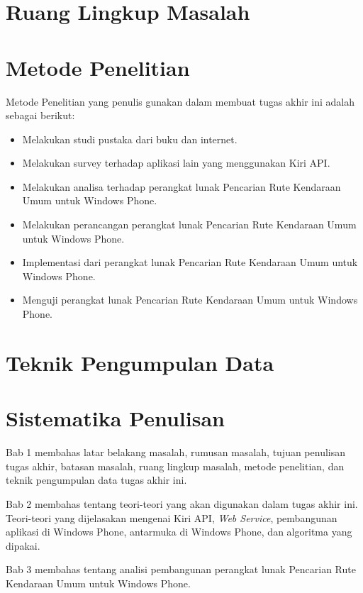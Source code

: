\section{Ruang Lingkup Masalah}
\label{sec:ruang_lingkup_masalah}

\section{Metode Penelitian}
\label{sec:metode_penelitian}
Metode Penelitian yang penulis gunakan dalam membuat tugas akhir ini adalah sebagai berikut:
\begin{itemize}
	\item Melakukan studi pustaka dari buku dan internet.
	\item Melakukan survey terhadap aplikasi lain yang menggunakan Kiri API.
	\item Melakukan analisa terhadap perangkat lunak Pencarian Rute Kendaraan Umum untuk Windows Phone.
	\item Melakukan perancangan perangkat lunak Pencarian Rute Kendaraan Umum untuk Windows Phone.
	\item Implementasi dari perangkat lunak Pencarian Rute Kendaraan Umum untuk Windows Phone.
	\item Menguji perangkat lunak Pencarian Rute Kendaraan Umum untuk Windows Phone.
\end{itemize}

\section{Teknik Pengumpulan Data}
\label{sec:teknik_pengumpulan_data}

\section{Sistematika Penulisan}
\label{sec:sistematika_penulisan}
\hspace{0.5cm} Bab 1 membahas latar belakang masalah, rumusan masalah, tujuan penulisan tugas akhir, batasan masalah, ruang lingkup masalah, metode penelitian, dan teknik pengumpulan data tugas akhir ini.

\hspace{0.5cm} Bab 2 membahas tentang teori-teori yang akan digunakan dalam tugas akhir ini. Teori-teori yang dijelasakan mengenai Kiri API, \textit{Web Service}, pembangunan aplikasi di Windows Phone, antarmuka di Windows Phone, dan algoritma yang dipakai. 

\hspace{0.5cm} Bab 3 membahas tentang analisi pembangunan perangkat lunak Pencarian Rute Kendaraan Umum untuk Windows Phone.